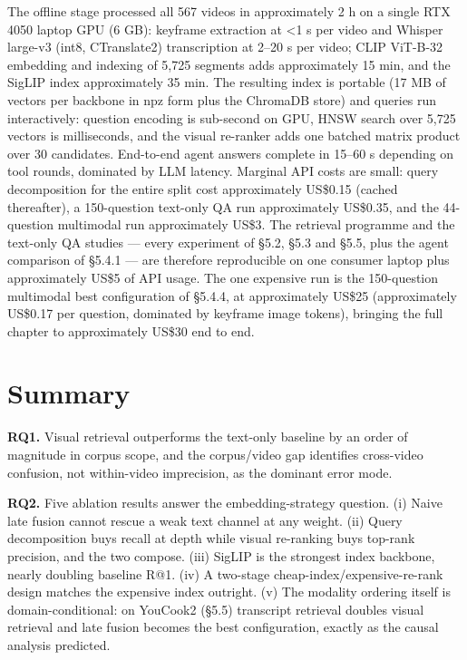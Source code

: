 The offline stage processed all 567 videos in approximately 2 h on a
single RTX 4050 laptop GPU (6 GB): keyframe extraction at \textless1 s
per video and Whisper large-v3 (int8, CTranslate2) transcription at
2--20 s per video; CLIP ViT-B-32 embedding and indexing of 5,725
segments adds approximately 15 min, and the SigLIP index approximately
35 min. The resulting index is portable (17 MB of vectors per backbone
in npz form plus the ChromaDB store) and queries run interactively:
question encoding is sub-second on GPU, HNSW search over 5,725 vectors
is milliseconds, and the visual re-ranker adds one batched matrix
product over 30 candidates. End-to-end agent answers complete in 15--60
s depending on tool rounds, dominated by LLM latency. Marginal API costs
are small: query decomposition for the entire split cost approximately
US\$0.15 (cached thereafter), a 150-question text-only QA run
approximately US\$0.35, and the 44-question multimodal run approximately
US\$3. The retrieval programme and the text-only QA studies --- every
experiment of §5.2, §5.3 and §5.5, plus the agent comparison of §5.4.1
--- are therefore reproducible on one consumer laptop plus approximately
US\$5 of API usage. The one expensive run is the 150-question multimodal
best configuration of §5.4.4, at approximately US\$25 (approximately
US\$0.17 per question, dominated by keyframe image tokens), bringing the
full chapter to approximately US\$30 end to end.

\section{Summary}

\textbf{RQ1.} Visual retrieval outperforms the text-only baseline by an
order of magnitude in corpus scope, and the corpus/video gap identifies
cross-video confusion, not within-video imprecision, as the dominant
error mode.

\textbf{RQ2.} Five ablation results answer the embedding-strategy
question. (i) Naive late fusion cannot rescue a weak text channel at any
weight. (ii) Query decomposition buys recall at depth while visual
re-ranking buys top-rank precision, and the two compose. (iii) SigLIP is
the strongest index backbone, nearly doubling baseline R@1. (iv) A
two-stage cheap-index/expensive-re-rank design matches the expensive
index outright. (v) The modality ordering itself is domain-conditional:
on YouCook2 (§5.5) transcript retrieval doubles visual retrieval and
late fusion becomes the best configuration, exactly as the causal
analysis predicted.

